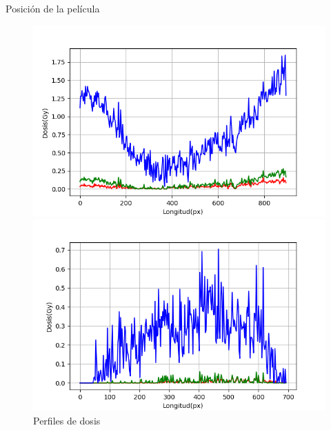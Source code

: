 \documentclass[12pt]{beamer}
\begin{document}
\begin{frame}{Posición de la película}
\begin{figure}[htp]
\begin{minipage}{0.45\textwidth}
	\end{minipage}\par
	\begin{minipage}{0.45\textwidth}
		\includegraphics[width=\textwidth]{images/perfilDosisCeroHorizontal.png}
	\end{minipage}\hfill
	\begin{minipage}{0.45\textwidth}
		\includegraphics[width=\textwidth]{images/perfilDosisCeroVerticalEnCentro.png}
	\end{minipage}
	\caption{Perfiles de dosis}
\end{figure}
\end{frame}
\end{document}
